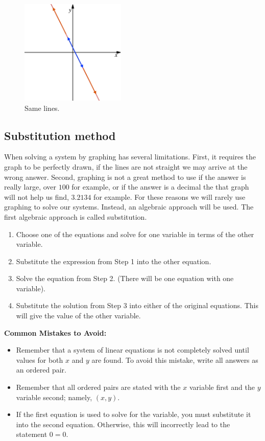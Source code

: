 \begin{enumerate}[I.]
		\begin{figure}[H]
			 \includegraphics[width=5cm]{pics/line_same.png}
			 \centering
			 \caption{Same lines.}
			 \label{fig:line_same}
		\end{figure}
\end{enumerate}
\subsection{Substitution method}
When solving a system by graphing has several limitations. First, it requires the graph to be perfectly drawn, if the lines are not straight we may arrive at the wrong answer. Second, graphing is not a great method to use if the answer is really large, over $100$ for example, or if the answer is a decimal the that graph will not  help us find, $3.2134$ for example. For these reasons we will rarely use graphing to solve our systems. Instead, an algebraic approach will be used. The first algebraic approach is called substitution.
%
\begin{tcolorbox}[title= Substitution Method,fonttitle=\bfseries,
	                  colframe=blue!70!black,
	                  colback=white]
\begin{enumerate}
    \item	Choose one of the equations and solve for one variable in 
            terms of the other variable.
    \item	Substitute the expression from Step 1 into the other    
            equation. 
    \item	Solve the equation from Step 2. (There will be one equation         with one variable). 
    \item	Substitute the solution from Step 3 into either of the 
            original equations. This will give the value of the other variable.
\end{enumerate}
\end{tcolorbox}
%
\textbf{Common Mistakes to Avoid:}
\begin{itemize}
    \item	Remember that a system of linear equations is not completely         solved until values for both $x$ and $y$ are found. To avoid         this mistake, write all answers as an ordered pair.
    \item	Remember that all ordered pairs are stated with the
            $x$ variable first and the $y$ variable second; namely, $(x, y)$. 
    \item	If the first equation is used to solve for the variable,
            you must substitute it into the second equation. Otherwise, this will incorrectly lead to the statement $0 = 0$.
\end{itemize}
